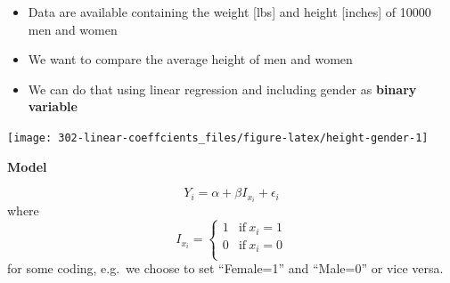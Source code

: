 \documentclass[
]{book}
\newenvironment{Shaded}{\begin{snugshade}}{\end{snugshade}}
\newcommand{\CommentTok}[1]{\textcolor[rgb]{0.56,0.35,0.01}{\textit{#1}}}
\newcommand{\DataTypeTok}[1]{\textcolor[rgb]{0.13,0.29,0.53}{#1}}
\newcommand{\KeywordTok}[1]{\textcolor[rgb]{0.13,0.29,0.53}{\textbf{#1}}}
\newcommand{\NormalTok}[1]{#1}
\newcommand{\OperatorTok}[1]{\textcolor[rgb]{0.81,0.36,0.00}{\textbf{#1}}}
\newcommand{\StringTok}[1]{\textcolor[rgb]{0.31,0.60,0.02}{#1}}
\providecommand{\tightlist}{%
  \setlength{\itemsep}{0pt}\setlength{\parskip}{0pt}}
\theoremstyle{definition}
\theoremstyle{definition}
\theoremstyle{definition}
\theoremstyle{remark}
\begin{document}
\begin{itemize}
\tightlist
\item
  Data are available containing the weight {[}lbs{]} and height {[}inches{]} of 10000 men and women
\item
  We want to compare the average height of men and women
\item
  We can do that using linear regression and including gender as \textbf{binary variable}
\end{itemize}

\begin{Shaded}
\end{Shaded}

\begin{center}\texttt{[image: 302-linear-coeffcients\_files/figure-latex/height-gender-1]} \end{center}

\textbf{Model}

\[Y_i = \alpha + \beta I_{x_i} + \epsilon_i\]
where
\begin{equation}
    I_{x_i} =
    \left\{
        \begin{array}{cc}
                1 & \mathrm{if\ } x_i=1 \\
                0 & \mathrm{if\ } x_i=0 \\
        \end{array}
    \right.
\end{equation}
for some coding, e.g.~we choose to set ``Female=1'' and ``Male=0'' or vice versa.
\end{document}
